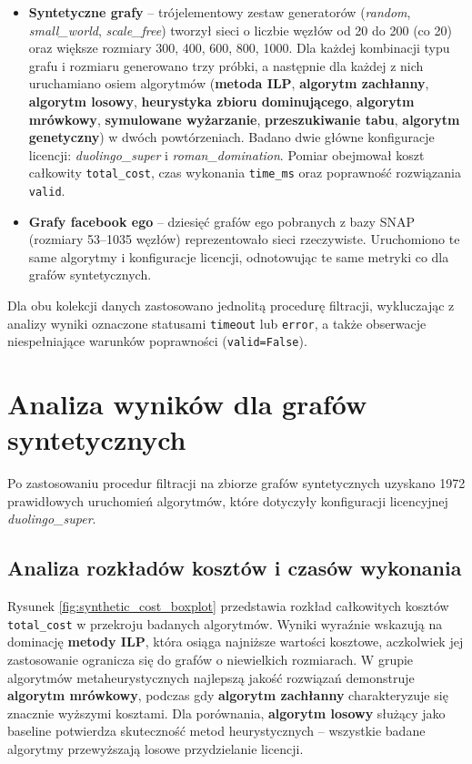 \begin{itemize}
  \item \textbf{Syntetyczne grafy} -- trójelementowy zestaw generatorów (\emph{random}, \emph{small\_world}, \emph{scale\_free}) tworzył sieci o liczbie węzłów od 20 do 200 (co 20) oraz większe rozmiary 300, 400, 600, 800, 1000. Dla każdej kombinacji typu grafu i rozmiaru generowano trzy próbki, a następnie dla każdej z nich uruchamiano osiem algorytmów (\textbf{metoda ILP}, \textbf{algorytm zachłanny}, \textbf{algorytm losowy}, \textbf{heurystyka zbioru dominującego}, \textbf{algorytm mrówkowy}, \textbf{symulowane wyżarzanie}, \textbf{przeszukiwanie tabu}, \textbf{algorytm genetyczny}) w dwóch powtórzeniach. Badano dwie główne konfiguracje licencji: \emph{duolingo\_super} i \emph{roman\_domination}. Pomiar obejmował koszt całkowity \texttt{total\_cost}, czas wykonania \texttt{time\_ms} oraz poprawność rozwiązania \texttt{valid}.

  \item \textbf{Grafy facebook ego} -- dziesięć grafów ego pobranych z bazy SNAP (rozmiary 53--1035 węzłów) reprezentowało sieci rzeczywiste. Uruchomiono te same algorytmy i konfiguracje licencji, odnotowując te same metryki co dla grafów syntetycznych.
\end{itemize}

Dla obu kolekcji danych zastosowano jednolitą procedurę filtracji, wykluczając z analizy wyniki oznaczone statusami \texttt{timeout} lub \texttt{error}, a także obserwacje niespełniające warunków poprawności (\texttt{valid=False}).

\section{Analiza wyników dla grafów syntetycznych}

Po zastosowaniu procedur filtracji na zbiorze grafów syntetycznych uzyskano 1972 prawidłowych uruchomień algorytmów, które dotyczyły konfiguracji licencyjnej \emph{duolingo\_super}.

\subsection{Analiza rozkładów kosztów i czasów wykonania}

Rysunek \ref{fig:synthetic_cost_boxplot} przedstawia rozkład całkowitych kosztów \texttt{total\_cost} w przekroju badanych algorytmów. Wyniki wyraźnie wskazują na dominację \textbf{metody ILP}, która osiąga najniższe wartości kosztowe, aczkolwiek jej zastosowanie ogranicza się do grafów o niewielkich rozmiarach. W grupie algorytmów metaheurystycznych najlepszą jakość rozwiązań demonstruje \textbf{algorytm mrówkowy}, podczas gdy \textbf{algorytm zachłanny} charakteryzuje się znacznie wyższymi kosztami. Dla porównania, \textbf{algorytm losowy} służący jako baseline potwierdza skuteczność metod heurystycznych -- wszystkie badane algorytmy przewyższają losowe przydzielanie licencji.

